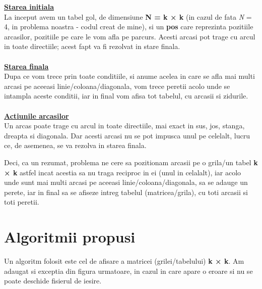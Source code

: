\documentclass{article}
\begin{document}
\hspace{1cm} \textbf{\underline{Starea initiala}}\\

La inceput avem un tabel gol, de dimensiune \textbf{N = k × k} (in cazul de fata \textit{N} = 4, in problema noastra - codul creat de mine), si un \textbf{pos} care reprezinta pozitiile arcasilor, pozitiile pe care le vom afla pe parcurs. Acesti arcasi pot trage cu arcul in toate directiile; acest fapt va fi rezolvat in stare finala.\\\\

\hspace{1cm} \textbf{\underline{Starea finala}}\\

Dupa ce vom trece prin toate conditiile, si anume acelea in care se afla mai multi arcasi pe aceeasi linie/coloana/diagonala, vom trece peretii acolo unde se intampla aceste conditii, iar in final vom afisa tot tabelul, cu arcasii si zidurile. \\\\


\hspace{1cm} \textbf{\underline{Actiunile arcasilor}}\\

Un arcas poate trage cu arcul in toate directiile, mai exact in sus, jos, stanga, dreapta si diagonala. Dar acesti arcasi nu se pot impusca unul pe celelalt, lucru ce, de asemenea, se va rezolva in starea finala. \\

\vspace{1cm}

\hspace{1cm} Deci, ca un rezumat, problema ne cere sa pozitionam arcasii pe o grila/un tabel \textbf{k × k} astfel incat acestia sa nu traga reciproc in ei (unul in celalalt), iar acolo unde sunt mai multi arcasi pe aceeasi linie/coloana/diagonala, sa se adauge un perete, iar in final sa se afiseze intreg tabelul (matricea/grila), cu toti arcasii si toti peretii.

\newpage 
\section{Algoritmii propusi}
\vspace{1cm} 
\hspace{1cm}Un algoritm folosit este cel de afisare a matricei (grilei/tabelului) \textbf{k × k}. Am adaugat si exceptia din figura urmatoare, in cazul in care apare o eroare si nu se poate deschide fisierul de iesire. \\
\end{document}
